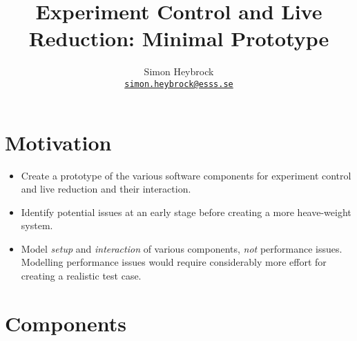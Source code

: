 \documentclass[a4paper,english,numbers=noenddot,bibliography=totoc,chapterprefix=on,DIV=12]{scrartcl}
\begin{document}
\title{Experiment Control and Live Reduction: Minimal Prototype}
\author{Simon Heybrock\\
    {\small\href{mailto:simon.heybrock@esss.se}{\nolinkurl{simon.heybrock@esss.se}}}}

\maketitle

\tableofcontents


\section{Motivation}

\begin{itemize}
  \item Create a prototype of the various software components for experiment control and live reduction and their interaction.
  \item Identify potential issues at an early stage before creating a more heave-weight system.
  \item Model \emph{setup} and \emph{interaction} of various components, \emph{not} performance issues.
    Modelling performance issues would require considerably more effort for creating a realistic test case.
\end{itemize}


\section{Components}
\end{document}
